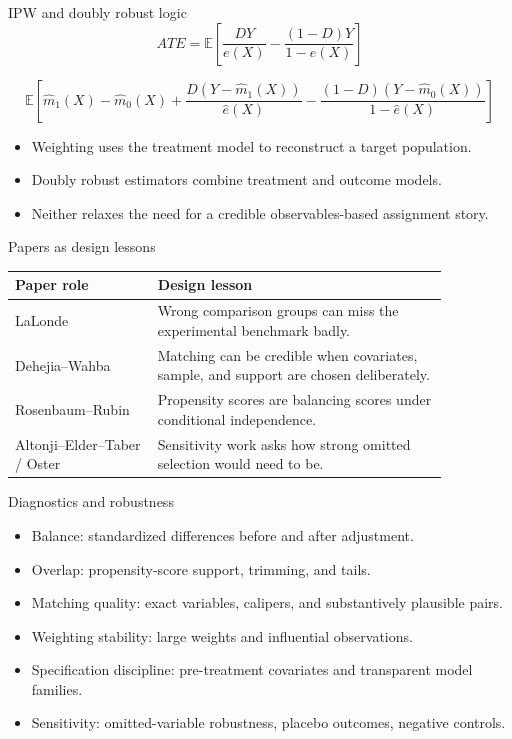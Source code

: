 \documentclass[aspectratio=169,11pt]{beamer}
\newcommand{\E}{\mathbb{E}}
\begin{document}
\begin{frame}{IPW and doubly robust logic}
\[
ATE =
\E\left[
\frac{DY}{e(X)} -
\frac{(1-D)Y}{1-e(X)}
\right]
\]

\[
\E\left[
\hat m_1(X)-\hat m_0(X)
+
\frac{D(Y-\hat m_1(X))}{\hat e(X)}
-
\frac{(1-D)(Y-\hat m_0(X))}{1-\hat e(X)}
\right]
\]

\begin{itemize}
    \item Weighting uses the treatment model to reconstruct a target population.
    \item Doubly robust estimators combine treatment and outcome models.
    \item Neither relaxes the need for a credible observables-based assignment story.
\end{itemize}
\end{frame}

\begin{frame}{Papers as design lessons}
\small
\begin{tabular}{p{0.28\linewidth} p{0.58\linewidth}}
\toprule
Paper role & Design lesson \\
\midrule
LaLonde & Wrong comparison groups can miss the experimental benchmark badly. \\
Dehejia--Wahba & Matching can be credible when covariates, sample, and support are chosen deliberately. \\
Rosenbaum--Rubin & Propensity scores are balancing scores under conditional independence. \\
Altonji--Elder--Taber / Oster & Sensitivity work asks how strong omitted selection would need to be. \\
\bottomrule
\end{tabular}
\end{frame}

\begin{frame}{Diagnostics and robustness}
\begin{itemize}
    \item Balance: standardized differences before and after adjustment.
    \item Overlap: propensity-score support, trimming, and tails.
    \item Matching quality: exact variables, calipers, and substantively plausible pairs.
    \item Weighting stability: large weights and influential observations.
    \item Specification discipline: pre-treatment covariates and transparent model families.
    \item Sensitivity: omitted-variable robustness, placebo outcomes, negative controls.
\end{itemize}
\end{frame}
\end{document}
